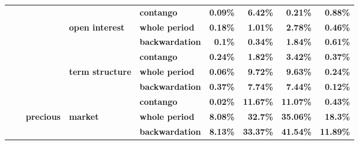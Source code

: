 \documentclass[
  authoryear,
  preprint,
  3p]{elsarticle}
\begin{document}
\begin{longtable}[t]{>{}l>{}l>{}l>{}l>{}l>{}r>{}r>{}r>{}r}
\addlinespace
\textbf{} & \textbf{} & \textbf{} & \textbf{} & \textbf{contango} & \textcolor[HTML]{4285f4}{\textbf{0.09\%}} & \textcolor[HTML]{4285f4}{\textbf{6.42\%}} & \textcolor[HTML]{4285f4}{\textbf{0.21\%}} & \textcolor[HTML]{4285f4}{\textbf{0.88\%}}\\
\textbf{} & \textbf{} & \textbf{} & \textbf{open interest} & \textbf{whole period} & \textcolor[HTML]{4285f4}{\textbf{0.18\%}} & \textcolor[HTML]{4285f4}{\textbf{1.01\%}} & \textcolor[HTML]{4285f4}{\textbf{2.78\%}} & \textcolor[HTML]{4285f4}{\textbf{0.46\%}}\\
\textbf{} & \textbf{} & \textbf{} & \textbf{} & \textbf{backwardation} & \textcolor[HTML]{4285f4}{\textbf{0.1\%}} & \textcolor[HTML]{4285f4}{\textbf{0.34\%}} & \textcolor[HTML]{4285f4}{\textbf{1.84\%}} & \textcolor[HTML]{4285f4}{\textbf{0.61\%}}\\
\textbf{} & \textbf{} & \textbf{} & \textbf{} & \textbf{contango} & \textcolor[HTML]{4285f4}{\textbf{0.24\%}} & \textcolor[HTML]{4285f4}{\textbf{1.82\%}} & \textcolor[HTML]{4285f4}{\textbf{3.42\%}} & \textcolor[HTML]{4285f4}{\textbf{0.37\%}}\\
\textbf{} & \textbf{} & \textbf{} & \textbf{term structure} & \textbf{whole period} & \textcolor[HTML]{4285f4}{\textbf{0.06\%}} & \textcolor[HTML]{4285f4}{\textbf{9.72\%}} & \textcolor[HTML]{4285f4}{\textbf{9.63\%}} & \textcolor[HTML]{4285f4}{\textbf{0.24\%}}\\
\addlinespace
\textbf{} & \textbf{} & \textbf{} & \textbf{} & \textbf{backwardation} & \textcolor[HTML]{4285f4}{\textbf{0.37\%}} & \textcolor[HTML]{4285f4}{\textbf{7.74\%}} & \textcolor[HTML]{4285f4}{\textbf{7.44\%}} & \textcolor[HTML]{4285f4}{\textbf{0.12\%}}\\
\textbf{} & \textbf{} & \textbf{} & \textbf{} & \textbf{contango} & \textcolor[HTML]{4285f4}{\textbf{0.02\%}} & \textcolor[HTML]{4285f4}{\textbf{11.67\%}} & \textcolor[HTML]{4285f4}{\textbf{11.07\%}} & \textcolor[HTML]{4285f4}{\textbf{0.43\%}}\\
\textbf{} & \textbf{} & \textbf{precious} & \textbf{market} & \textbf{whole period} & \textcolor[HTML]{4285f4}{\textbf{8.08\%}} & \textcolor[HTML]{4285f4}{\textbf{32.7\%}} & \textcolor[HTML]{4285f4}{\textbf{35.06\%}} & \textcolor[HTML]{4285f4}{\textbf{18.3\%}}\\
\textbf{} & \textbf{} & \textbf{} & \textbf{} & \textbf{backwardation} & \textcolor[HTML]{4285f4}{\textbf{8.13\%}} & \textcolor[HTML]{4285f4}{\textbf{33.37\%}} & \textcolor[HTML]{4285f4}{\textbf{41.54\%}} & \textcolor[HTML]{4285f4}{\textbf{11.89\%}}\\

\end{longtable}
\end{document}
